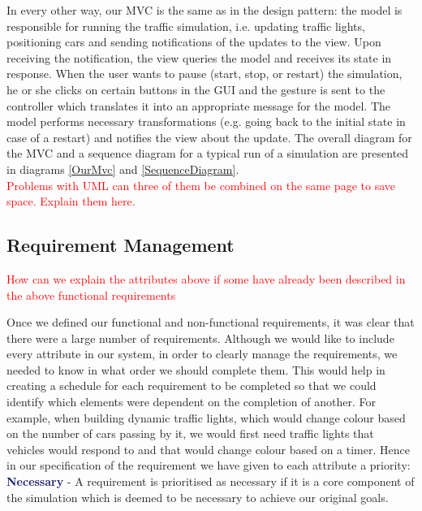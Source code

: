 \documentclass{article}
\begin{document}
	In every other way, our MVC is the same as in the design pattern: the model is responsible for running the traffic simulation, i.e. updating traffic lights, positioning cars and sending notifications of the updates to the view. Upon receiving the notification, the view queries the model and receives its state in response. 
	When the user wants to pause (start, stop, or restart) the simulation, he or she clicks on certain buttons in the GUI and the gesture is sent to the controller which translates it into an appropriate message for the model. 
	The model performs necessary transformations (e.g. going back to the initial state in case of a restart) and notifies the view about the update. 
	The overall diagram for the MVC and a sequence diagram for a typical run of a simulation are presented in diagrams \ref{OurMvc} and \ref{SequenceDiagram}. \\
	
	\textcolor{red}{Problems with UML can three of them be combined on the same page to save space. Explain them here.}
	
	\subsection{Requirement Management}\label{Requirement Management}
	\textcolor{red}{How can we explain the attributes above if some have already been described in the above functional requirements\\
	}
	
	Once we defined our functional and non-functional requirements, it was clear that there were a large number of requirements. 
	Although we would like to include every attribute in our system, in order to clearly manage the requirements, we needed to know in what order we should complete them. 
	This would help in creating a schedule for each requirement to be completed so that we could identify which elements were dependent on the completion of another. 
	For example, when building dynamic traffic lights, which would change colour based on the number of cars passing by it, we would first need traffic lights that vehicles would respond to and that would change colour based on a timer. 
	Hence in our specification of the requirement we have given to each attribute a priority:\\
	
	\noindent
	\textcolor{MidnightBlue}{\bf Necessary}
	- A requirement is prioritised as necessary if it is a core component of the simulation which is deemed to be necessary to achieve our original goals.\\
	
\end{document}
